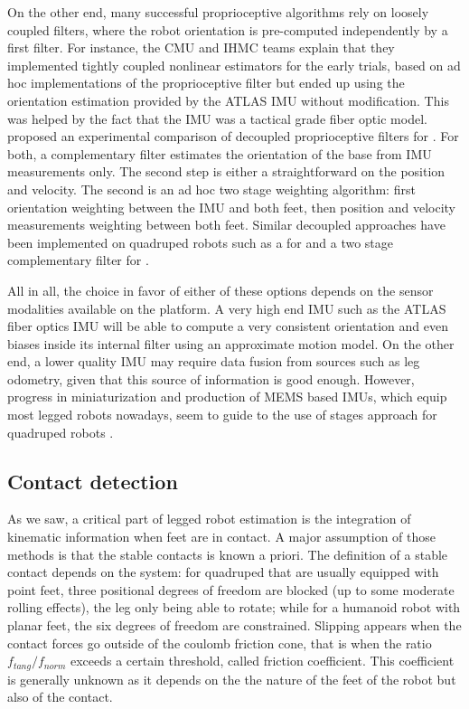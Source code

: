 On the other end, many successful proprioceptive algorithms rely on loosely coupled filters, where the robot orientation is pre-computed
independently by a first filter. For instance, the CMU \cite{feng2015optimization} and IHMC \cite{johnson2015team} teams explain that they
implemented tightly coupled nonlinear estimators for the early trials, based on ad hoc implementations of the proprioceptive filter but ended up using 
the orientation estimation provided by the ATLAS IMU without modification. This was helped by the fact that the IMU was a tactical grade fiber optic model. 
\cite{flayols2017experimental} proposed an experimental comparison of decoupled proprioceptive filters for . For both, a complementary filter estimates 
the orientation of the base from IMU measurements only. The second step is either a straightforward \KalmanF on the position and velocity. 
The second is an ad hoc two stage weighting algorithm: first orientation weighting between the IMU and both feet, then position and velocity measurements 
weighting between both feet. Similar decoupled approaches have been implemented on quadruped robots such as a \KalmanF for \cite{bledt2018cheetah} and a two 
stage complementary filter for \cite{leziart2021implementation}.

All in all, the choice in favor of either of these options depends on the sensor modalities available on the platform. A very high end IMU such as the ATLAS fiber optics
IMU will be able to compute a very consistent orientation and even biases inside its internal filter using an approximate motion model. On the other end,
a lower quality IMU may require data fusion from sources such as leg odometry, given that this source of information is good enough. However, progress in 
miniaturization and production of MEMS based IMUs, which equip most legged robots nowadays, seem to guide to the use of stages approach for quadruped robots \cite{bledt2018cheetah, leziart2021implementation}.



\subsection{Contact detection}
As we saw, a critical part of legged robot estimation is the integration of kinematic information when feet are in contact. A major
assumption of those methods is that the stable contacts is known a priori. The definition of a stable contact depends on the system: for quadruped that 
are usually equipped with point feet, three positional degrees of freedom are blocked (up to some moderate rolling effects), the leg only being able to rotate; while for a humanoid robot with
planar feet, the six degrees of freedom are constrained. Slipping appears when the contact forces go outside of the coulomb friction cone, that is when the ratio $f_{tang}/f_{norm}$
exceeds a certain threshold, called friction coefficient. This coefficient is generally unknown as it depends on the the nature of the feet of the robot but also of the contact.

